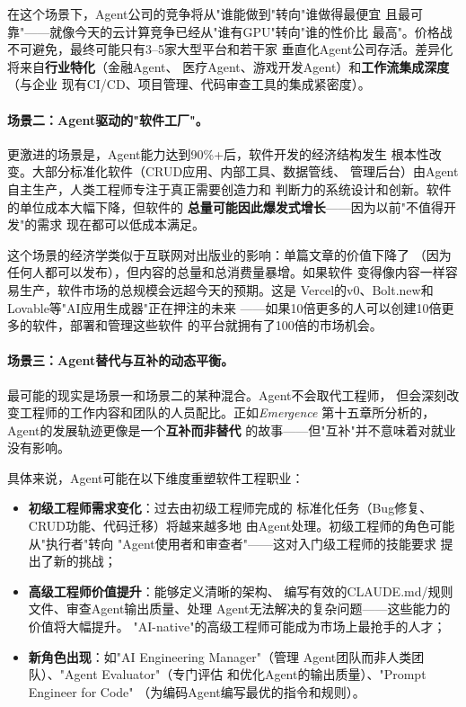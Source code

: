 在这个场景下，Agent公司的竞争将从"谁能做到"转向"谁做得最便宜
且最可靠"——就像今天的云计算竞争已经从"谁有GPU"转向"谁的性价比
最高"。价格战不可避免，最终可能只有3--5家大型平台和若干家
垂直化Agent公司存活。差异化将来自\textbf{行业特化}（金融Agent、
医疗Agent、游戏开发Agent）和\textbf{工作流集成深度}（与企业
现有CI/CD、项目管理、代码审查工具的集成紧密度）。

\paragraph{场景二：Agent驱动的"软件工厂"。}
更激进的场景是，Agent能力达到90\%+后，软件开发的经济结构发生
根本性改变。大部分标准化软件（CRUD应用、内部工具、数据管线、
管理后台）由Agent自主生产，人类工程师专注于真正需要创造力和
判断力的系统设计和创新。软件的单位成本大幅下降，但软件的
\textbf{总量可能因此爆发式增长}——因为以前"不值得开发"的需求
现在都可以低成本满足。

这个场景的经济学类似于互联网对出版业的影响：单篇文章的价值下降了
（因为任何人都可以发布），但内容的总量和总消费量暴增。如果软件
变得像内容一样容易生产，软件市场的总规模会远超今天的预期。这是
Vercel的v0、Bolt.new和Lovable等"AI应用生成器"正在押注的未来
——如果10倍更多的人可以创建10倍更多的软件，部署和管理这些软件
的平台就拥有了100倍的市场机会。

\paragraph{场景三：Agent替代与互补的动态平衡。}
最可能的现实是场景一和场景二的某种混合。Agent不会取代工程师，
但会深刻改变工程师的工作内容和团队的人员配比。正如\textit{Emergence}
第十五章所分析的，Agent的发展轨迹更像是一个\textbf{互补而非替代}
的故事——但"互补"并不意味着对就业没有影响。

具体来说，Agent可能在以下维度重塑软件工程职业：

\begin{itemize}
  \item \textbf{初级工程师需求变化}：过去由初级工程师完成的
    标准化任务（Bug修复、CRUD功能、代码迁移）将越来越多地
    由Agent处理。初级工程师的角色可能从"执行者"转向
    "Agent使用者和审查者"——这对入门级工程师的技能要求
    提出了新的挑战；
  \item \textbf{高级工程师价值提升}：能够定义清晰的架构、
    编写有效的CLAUDE.md/规则文件、审查Agent输出质量、处理
    Agent无法解决的复杂问题——这些能力的价值将大幅提升。
    "AI-native"的高级工程师可能成为市场上最抢手的人才；
  \item \textbf{新角色出现}：如"AI Engineering Manager"（管理
    Agent团队而非人类团队）、"Agent Evaluator"（专门评估
    和优化Agent的输出质量）、"Prompt Engineer for Code"
    （为编码Agent编写最优的指令和规则）。
\end{itemize}

